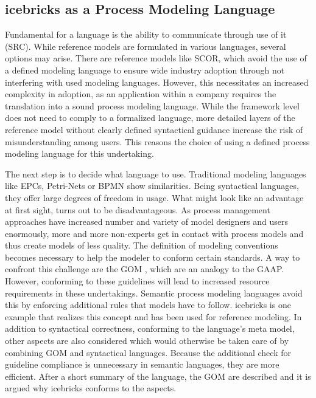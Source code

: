 		\subsection{icebricks as a Process Modeling Language}
		
	 Fundamental for a language is the ability to communicate through use of it (SRC). While reference models are formulated in various languages, several options may arise. There are reference models like \acrshort{SCOR}, which avoid the use of a defined modeling language to ensure wide industry adoption through not interfering with used modeling languages. However, this necessitates an increased complexity in adoption, as an application within a company requires the translation into a sound process modeling language. While the framework level does not need to comply to a formalized language, more detailed layers of the reference model without clearly defined syntactical guidance increase the risk of misunderstanding among users.
	 This reasons the choice of using a defined process modeling language for this undertaking.
	 
	 The next step is to decide what language to use. Traditional modeling languages like EPCs, Petri-Nets or BPMN show similarities. Being syntactical languages, they offer large degrees of freedom in usage. What might look like an advantage at first sight, turns out to be disadvantageous. As process management approaches have increased number and variety of model designers and users enormously, more and more non-experts get in contact with process models and thus create models of less quality. The definition of modeling conventions becomes necessary to help the modeler to conform certain standards. A way to confront this challenge are the \acrfull{GOM} \cite{BeckerGOM2012}, which are an analogy to the \acrfull{GAAP}. However, conforming to these guidelines will lead to increased resource requirements in these undertakings. Semantic process modeling languages avoid this by enforcing additional rules that models have to follow. icebricks \cite{becker2015icebricks} is one example that realizes this concept and has been used for reference modeling. In addition to syntactical correctness, \ie conforming to the language's meta model, other aspects are also considered which would otherwise be taken care of by combining \acrshort{GOM} and syntactical languages. Because the additional check for guideline compliance is unnecessary in semantic languages, they are more efficient. After a short summary of the language,  the \acrshort{GOM} are described and it is argued why icebricks conforms to the aspects. 
	 
